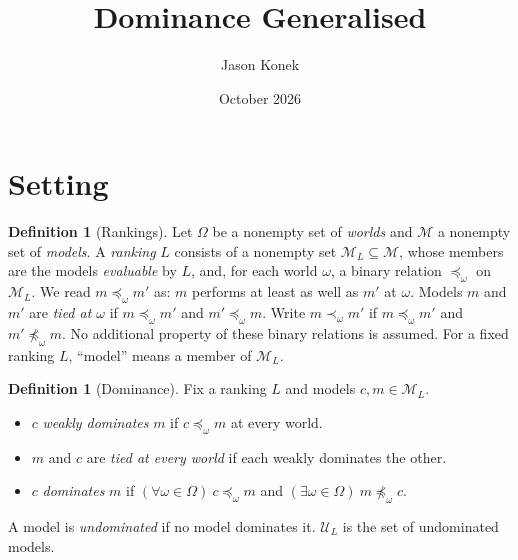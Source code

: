 \documentclass[11pt]{article}
\title{Dominance Generalised}
\author{Jason Konek}
\date{October 2026}
\theoremstyle{definition}
\newtheorem{definition}[theorem]{Definition}
\theoremstyle{remark}
\newcommand{\M}{\mathcal M}
\newcommand{\U}{\mathcal U}
\begin{document}
\maketitle

\section{Setting}\label{sec:setting}

\begin{definition}[Rankings]\label{def:rankings}
Let $\Omega$ be a nonempty set of \emph{worlds} and $\M$ a nonempty set of \emph{models}. A \emph{ranking} $L$ consists of a nonempty set $\M_L\subseteq\M$, whose members are the models \emph{evaluable} by $L$, and, for each world $\omega$, a binary relation $\preceq_\omega$ on $\M_L$. We read $m\preceq_\omega m'$ as: $m$ performs at least as well as $m'$ at $\omega$. Models $m$ and $m'$ are \emph{tied at $\omega$} if $m\preceq_\omega m'$ and $m'\preceq_\omega m$. Write $m\prec_\omega m'$ if $m\preceq_\omega m'$ and $m'\not\preceq_\omega m$. No additional property of these binary relations is assumed. For a fixed ranking $L$, ``model'' means a member of $\M_L$.
\end{definition}

\begin{definition}[Dominance]\label{def:dominance}
Fix a ranking $L$ and models $c,m\in\M_L$.
\begin{itemize}[leftmargin=*]
\item $c$ \emph{weakly dominates} $m$ if $c\preceq_\omega m$ at every world.
\item $m$ and $c$ are \emph{tied at every world} if each weakly dominates the other.
\item $c$ \emph{dominates} $m$ if $(\forall\omega\in\Omega)\ c\preceq_\omega m$ and $(\exists\omega\in\Omega)\ m\not\preceq_\omega c$.
\end{itemize}
A model is \emph{undominated} if no model dominates it. $\U_L$ is the set of undominated models.
\end{definition}
\end{document}
